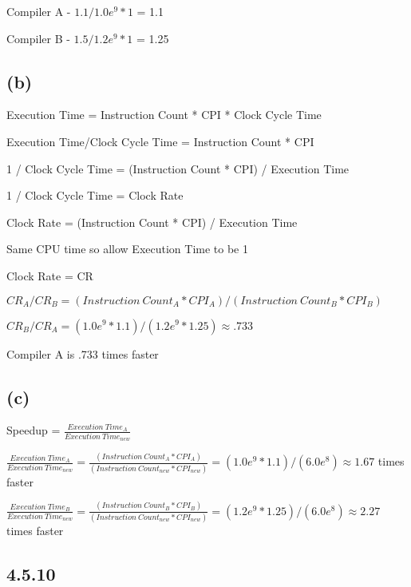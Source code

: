 \documentclass{article}
\begin{document}
    \vspace*{6pt}

    Compiler A - $1.1 / {1.0e^9 * 1}$ = 1.1

    Compiler B - $ 1.5 / {1.2e^9 * 1}$ = 1.25

    \subsection*{(b)}

    Execution Time = Instruction Count * CPI * Clock Cycle Time

    Execution Time/Clock Cycle Time = Instruction Count * CPI

    1 / Clock Cycle Time = (Instruction Count * CPI) / Execution Time

    1 / Clock Cycle Time = Clock Rate

    Clock Rate = (Instruction Count * CPI) / Execution Time

    Same CPU time so allow Execution Time to be 1 

    Clock Rate = CR

    \vspace*{6pt}

    $CR_A/CR_B = (Instruction\ Count_A * CPI_A)/(Instruction\ Count_B * CPI_B)$ 

    $CR_B/CR_A = (1.0e^9 * 1.1)/(1.2e^9 * 1.25) \approx .733$

    Compiler A is .733 times faster

    \subsection*{(c)}

    Speedup = $\frac{Execution\ Time_A}{Execution\ Time_{new}}$

    \vspace*{6pt}
    
    $\frac{Execution\ Time_A}{Execution\ Time_{new}} = \frac{(Instruction\ Count_A * CPI_A)}{(Instruction\ Count_{new} * CPI_{new})} = (1.0e^9 * 1.1)/(6.0e^8) \approx 1.67$ times faster

    \vspace*{6pt}

    $\frac{Execution\ Time_B}{Execution\ Time_{new}} = \frac{(Instruction\ Count_B * CPI_B)}{(Instruction\ Count_{new} * CPI_{new})} = (1.2e^9 * 1.25)/(6.0e^8) \approx 2.27$ times faster

    \newpage

    \subsection*{4.5.10}
\end{document}
